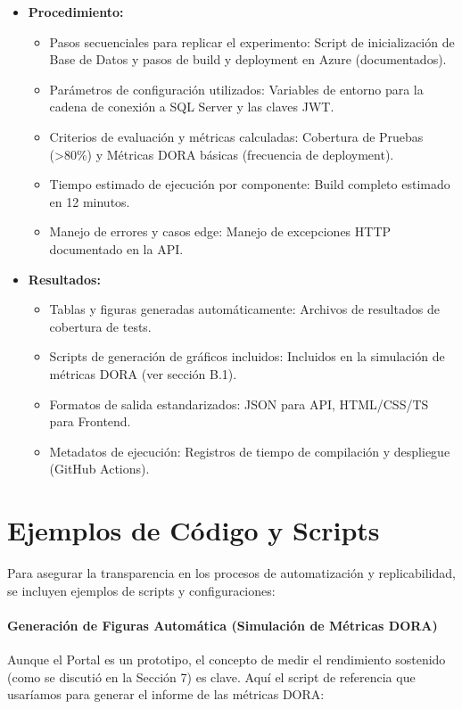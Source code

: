 \begin{itemize}[leftmargin=*]
\item \textbf{Procedimiento:}
  \begin{itemize}
  \item Pasos secuenciales para replicar el experimento: Script de inicialización de Base de Datos y pasos de build y deployment en Azure (documentados).
  \item Parámetros de configuración utilizados: Variables de entorno para la cadena de conexión a SQL Server y las claves JWT.
  \item Criterios de evaluación y métricas calculadas: Cobertura de Pruebas (>80\%) y Métricas DORA básicas (frecuencia de deployment).
  \item Tiempo estimado de ejecución por componente: Build completo estimado en 12 minutos.
  \item Manejo de errores y casos edge: Manejo de excepciones HTTP documentado en la API.
  \end{itemize}

\item \textbf{Resultados:}
  \begin{itemize}
  \item Tablas y figuras generadas automáticamente: Archivos de resultados de cobertura de tests.
  \item Scripts de generación de gráficos incluidos: Incluidos en la simulación de métricas DORA (ver sección B.1).
  \item Formatos de salida estandarizados: JSON para API, HTML/CSS/TS para Frontend.
  \item Metadatos de ejecución: Registros de tiempo de compilación y despliegue (GitHub Actions).
  \end{itemize}
\end{itemize}

\section{Ejemplos de Código y Scripts}

Para asegurar la transparencia en los procesos de automatización y replicabilidad, se incluyen ejemplos de scripts y configuraciones:

\paragraph{Generación de Figuras Automática (Simulación de Métricas DORA)}

Aunque el Portal es un prototipo, el concepto de medir el rendimiento sostenido (como se discutió en la Sección 7) es clave. Aquí el script de referencia que usaríamos para generar el informe de las métricas DORA:

